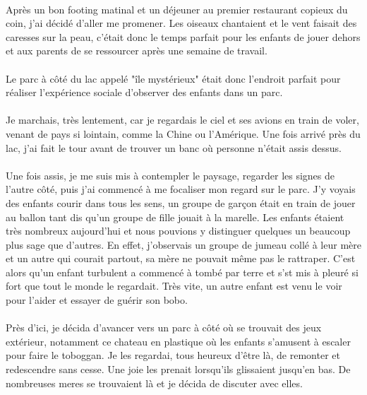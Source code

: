\paragraph{}
Après un bon footing matinal et un déjeuner au premier
restaurant copieux du coin, j'ai décidé d'aller me
promener. Les oiseaux chantaient et le vent faisait des
caresses sur la peau, c'était donc le temps parfait pour les
enfants de jouer dehors et aux parents de se ressourcer
après une semaine de travail.
\paragraph{}
Le parc à côté du lac appelé "île mystérieux" était donc
l'endroit parfait pour réaliser l'expérience sociale
d'observer des enfants dans un parc.
\paragraph{}
Je marchais, très lentement, car je regardais le ciel et ses
avions en train de voler, venant de pays si lointain, comme
la Chine ou l'Amérique. Une fois arrivé près du lac, j'ai fait
le tour avant de trouver un banc où personne n'était assis
dessus.
\paragraph{}
Une fois assis, je me suis mis à contempler le paysage,
regarder les signes de l'autre côté, puis j'ai commencé à
me focaliser mon regard sur le parc. J'y voyais des
enfants courir dans tous les sens, un groupe de garçon
était en train de jouer au ballon tant dis qu'un groupe de
fille jouait à la marelle. Les enfants étaient très nombreux
aujourd'hui et nous pouvions y distinguer quelques un
beaucoup plus sage que d'autres.
\paragreph{}
En effet, j'observais un groupe de jumeau collé à leur
mère et un autre qui courait partout, sa mère ne pouvait
même pas le rattraper. C'est alors qu'un enfant turbulent a
commencé à tombé par terre et s'st mis à pleuré si fort
que tout le monde le regardait. Très vite, un autre enfant
est venu le voir pour l'aider et essayer de guérir son bobo.
\paragraph{}
Près d’ici, je décida d’avancer vers un parc à côté où se
trouvait des jeux extérieur, notamment ce chateau en
plastique où les enfants s’amusent à escaler pour faire le
toboggan. Je les regardai, tous heureux d’être là, de remonter
et redescendre sans cesse. Une joie les prenait lorsqu’ils
glissaient jusqu’en bas. De nombreuses meres se trouvaient là
et je décida de discuter avec elles.
